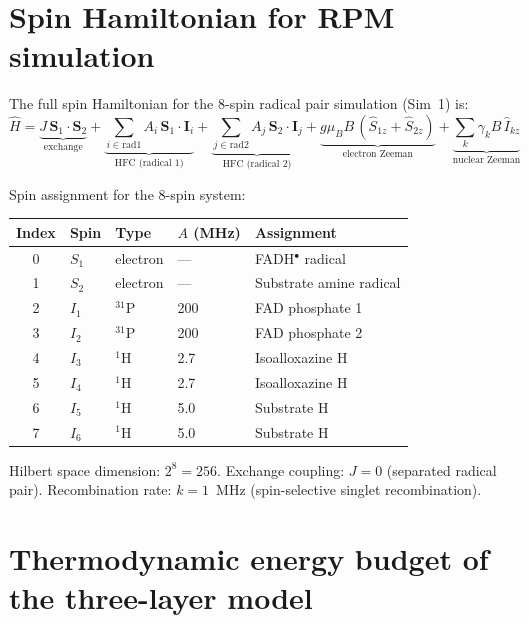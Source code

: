 \section{Spin Hamiltonian for RPM simulation}

The full spin Hamiltonian for the 8-spin radical pair simulation (Sim~1) is:
\begin{equation}
\hat{H} = \underbrace{J\,\mathbf{S}_1 \cdot \mathbf{S}_2}_{\text{exchange}} + \underbrace{\sum_{i \in \mathrm{rad1}} A_i\,\mathbf{S}_1 \cdot \mathbf{I}_i}_{\text{HFC (radical 1)}} + \underbrace{\sum_{j \in \mathrm{rad2}} A_j\,\mathbf{S}_2 \cdot \mathbf{I}_j}_{\text{HFC (radical 2)}} + \underbrace{g\mu_B B\,(\hat{S}_{1z} + \hat{S}_{2z})}_{\text{electron Zeeman}} + \underbrace{\sum_k \gamma_k B\,\hat{I}_{kz}}_{\text{nuclear Zeeman}}
\end{equation}

Spin assignment for the 8-spin system:

\begin{center}
\begin{tabular}{cllll}
\toprule
Index & Spin & Type & $A$ (MHz) & Assignment \\
\midrule
0 & $S_1$ & electron & --- & FADH$^\bullet$ radical \\
1 & $S_2$ & electron & --- & Substrate amine radical \\
2 & $I_1$ & $^{31}$P & 200 & FAD phosphate 1 \\
3 & $I_2$ & $^{31}$P & 200 & FAD phosphate 2 \\
4 & $I_3$ & $^1$H & 2.7 & Isoalloxazine H \\
5 & $I_4$ & $^1$H & 2.7 & Isoalloxazine H \\
6 & $I_5$ & $^1$H & 5.0 & Substrate H \\
7 & $I_6$ & $^1$H & 5.0 & Substrate H \\
\bottomrule
\end{tabular}
\end{center}

Hilbert space dimension: $2^8 = 256$. Exchange coupling: $J = 0$ (separated radical pair). Recombination rate: $k = 1$~MHz (spin-selective singlet recombination).



\newpage
\section{Thermodynamic energy budget of the three-layer model}

